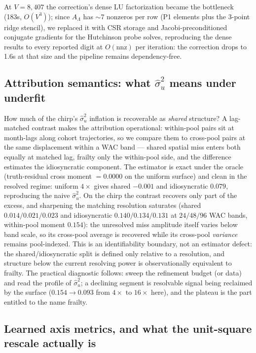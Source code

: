 \documentclass[11pt]{article}
\begin{document}
At $V=8{,}407$ the correction's dense LU factorization became the bottleneck
(183s, $O(V^3)$); since $A_\Lambda$ has $\sim$7 nonzeros per row (P1 elements
plus the 3-point ridge stencil), we replaced it with CSR storage and
Jacobi-preconditioned conjugate gradients for the Hutchinson probe solves,
reproducing the dense results to every reported digit at $O(\mathrm{nnz})$ per
iteration: the correction drops to 1.6s at that size and the pipeline remains
dependency-free.

\subsection{Attribution semantics: what $\hat\sigma_u^2$ means under underfit}
\label{sec:attribution-semantics}

How much of the chirp's $\hat\sigma_u^2$ inflation is recoverable as
\emph{shared} structure? A lag-matched contrast makes the attribution
operational: within-pool pairs sit at month-lags along cohort trajectories, so
we compare them to cross-pool pairs at the same displacement within a WAC band
--- shared spatial miss enters both equally at matched lag, frailty only the
within-pool side, and the difference estimates the idiosyncratic component.
The estimator is exact under the oracle (truth-residual cross moment $=0.0000$
on the uniform surface) and clean in the resolved regime: uniform $4\times$
gives shared $-0.001$ and idiosyncratic $0.079$, reproducing the naive
$\hat\sigma_u^2$. On the chirp the contrast recovers only part of the excess,
and sharpening the matching resolution saturates (shared $0.014/0.021/0.023$
and idiosyncratic $0.140/0.134/0.131$ at $24/48/96$ WAC bands, within-pool
moment $0.154$): the unresolved miss amplitude itself varies below band scale,
so its cross-pool average is recovered while its cross-pool \emph{variance}
remains pool-indexed. This is an identifiability boundary, not an estimator
defect: the shared/idiosyncratic split is defined only relative to a
resolution, and structure below the current resolving power is observationally
equivalent to frailty. The practical diagnostic follows: sweep the refinement
budget (or data) and read the profile of $\hat\sigma_u^2$; a declining
segment is resolvable signal being reclaimed by the surface ($0.154\to0.093$
from $4\times$ to $16\times$ here), and the plateau is the part entitled to
the name frailty.

\subsection{Learned axis metrics, and what the unit-square rescale actually is}
\label{sec:metric}
\end{document}
